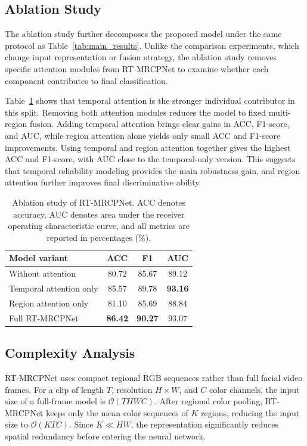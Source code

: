 \documentclass[runningheads]{llncs}
\begin{document}
\FloatBarrier

\subsection{Ablation Study}

The ablation study further decomposes the proposed model under the same protocol as Table~\ref{tab:main_results}. Unlike the comparison experiments, which change input representation or fusion strategy, the ablation study removes specific attention modules from RT-MRCPNet to examine whether each component contributes to final classification.

Table~\ref{tab:ablation} shows that temporal attention is the stronger individual contributor in this split. Removing both attention modules reduces the model to fixed multi-region fusion. Adding temporal attention brings clear gains in ACC, F1-score, and AUC, while region attention alone yields only small ACC and F1-score improvements. Using temporal and region attention together gives the highest ACC and F1-score, with AUC close to the temporal-only version. This suggests that temporal reliability modeling provides the main robustness gain, and region attention further improves final discriminative ability.

\begin{table}[!htbp]
\caption{Ablation study of RT-MRCPNet. ACC denotes accuracy, AUC denotes area under the receiver operating characteristic curve, and all metrics are reported in percentages (\%).}
\label{tab:ablation}
\centering
\begin{tabular}{lccc}
\toprule
Model variant & ACC & F1 & AUC \\
\midrule
Without attention & 80.72 & 85.67 & 89.12 \\
Temporal attention only & 85.57 & 89.78 & \textbf{93.16} \\
Region attention only & 81.10 & 85.69 & 88.84 \\
Full RT-MRCPNet & \textbf{86.42} & \textbf{90.27} & 93.07 \\
\bottomrule
\end{tabular}
\end{table}

\subsection{Complexity Analysis}

RT-MRCPNet uses compact regional RGB sequences rather than full facial video frames. For a clip of length $T$, resolution $H \times W$, and $C$ color channels, the input size of a full-frame model is $\mathcal{O}(T H W C)$. After regional color pooling, RT-MRCPNet keeps only the mean color sequences of $K$ regions, reducing the input size to $\mathcal{O}(K T C)$. Since $K \ll H W$, the representation significantly reduces spatial redundancy before entering the neural network.
\end{document}
